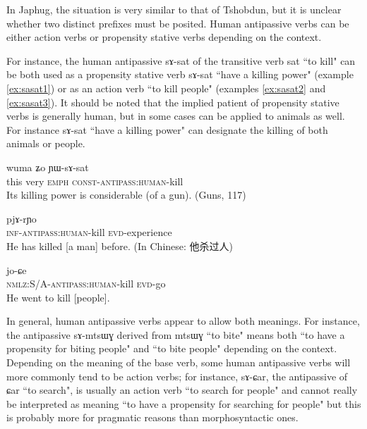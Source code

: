 \documentclass[oldfontcommands,oneside,a4paper,11pt]{article}
\newcommand{\ipa}[1]{{\phon \mbox{#1}}} %
\newcommand{\zh}[1]{{\cn #1}}
\begin{document}
In Japhug, the situation is very similar to that of Tshobdun, but it is unclear whether two distinct prefixes must be posited. Human antipassive verbs can be either action verbs or propensity stative verbs depending on the context.

For instance, the human antipassive \ipa{sɤ-sat} of the transitive verb \ipa{sat} ``to kill" can be both used as a propensity stative verb  \ipa{sɤ-sat} ``have a killing power" (example \ref{ex:sasat1}) or as an action verb ``to kill people" (examples \ref{ex:sasat2} and \ref{ex:sasat3}). It should be noted that the implied patient of   propensity stative verbs is generally human, but in some cases can be applied to animals as well. For instance   \ipa{sɤ-sat}  ``have a killing power" can designate the killing of both animals or   people.

    \begin{exe} 
\ex \label{ex:sasat1}
\gll  \ipa{nɯnɯ} \ipa{wuma} \ipa{ʑo} \ipa{ɲɯ-sɤ-sat}  \\
  this very \textsc{emph} \textsc{const-antipass:human}-kill \\
 \glt  Its killing power is considerable (of a gun). (Guns, 117)
\end{exe}    
 
     \begin{exe} 
\ex \label{ex:sasat2}
\gll  \ipa{kɤ-sɤ-sat}  \ipa{pjɤ-rɲo}\\
   \textsc{inf-antipass:human}-kill \textsc{evd}-experience \\
 \glt  He has killed [a man] before. (In Chinese: \zh{他杀过人})
 \end{exe}
      \begin{exe} 
 \ex \label{ex:sasat3}
\gll  \ipa{kɯ-sɤ-sat}  \ipa{jo-ɕe}\\
   \textsc{nmlz:S/A-antipass:human}-kill \textsc{evd}-go \\
 \glt  He went to kill [people].
\end{exe} 

In general, human antipassive verbs appear to allow both meanings. For instance, the antipassive \ipa{sɤ-mtsɯɣ} derived from \ipa{mtsɯɣ} ``to bite" means both ``to have a propensity for biting people" and ``to bite people" depending on the context. Depending on the meaning of the base verb, some human antipassive verbs will more commonly tend to be  action verbs; for instance, \ipa{sɤ-ɕar}, the antipassive of \ipa{ɕar} ``to search", is usually an action verb ``to search for people" and cannot really be interpreted as meaning ``to have a propensity for searching for people" but this is probably more for pragmatic reasons than morphosyntactic ones.  
\end{document}
